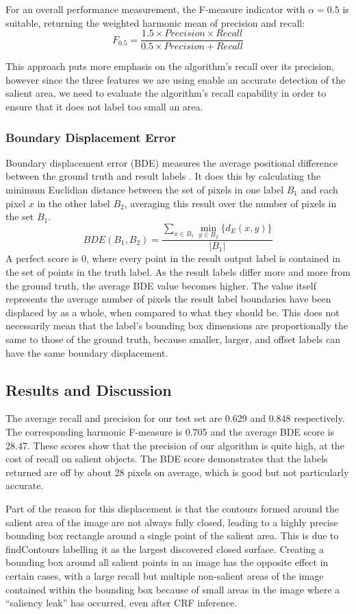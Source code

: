 \documentclass[10pt,twocolumn,letterpaper]{article}
\newcommand{\SUM}{\sum\limits}
\begin{document}
For an overall performance measurement, the F-measure indicator with $\alpha = 0.5$ is suitable, returning the weighted harmonic mean of precision and recall:$$F_{0.5} = \frac{1.5\times Precision \times Recall}{ 0.5 \times Precision + Recall}$$

This approach puts more emphasis on the algorithm's recall over its precision, however since the three features we are using enable an accurate detection of the salient area, we need to evaluate the algorithm's recall capability in order to ensure that it does not label too small an area.

\subsubsection{Boundary Displacement Error}
Boundary displacement error (BDE) measures the average positional difference between the ground truth and result labels \cite{bde}.  It does this by calculating the minimum Euclidian distance between the set of pixels in one label $B_1$ and each pixel $x$ in the other label $B_2$, averaging this result over the number of pixels in the set $B_1$. $$BDE(B_1,B_2)=\frac{\SUM_{x\in B_1}\min\limits_{y\in B_2}\{d_E(x,y)\}}{|B_1|}$$  A perfect score is 0, where every point in the result output label is contained in the set of points in the truth label.  As the result labels differ more and more from the ground truth, the average BDE value becomes higher.  The value itself represents the average number of pixels the result label boundaries have been displaced by as a whole, when compared to what they should be.  This does not necessarily mean that the label's bounding box dimensions are proportionally the same to those of the ground truth, because smaller, larger, and offset labels can have the same boundary displacement. 

\subsection{Results and Discussion}

The average recall and precision for our test set are 0.629 and 0.848 respectively.  The corresponding harmonic F-measure is 0.705 and the average BDE score is 28.47.  These scores show that the precision of our algorithm is quite high, at the cost of recall on salient objects.  The BDE score demonstrates that the labels returned are off by about 28 pixels on average, which is good but not particularly accurate.

Part of the reason for this displacement is that the contours formed around the salient area of the image are not always fully closed, leading to a highly precise bounding box rectangle around a single point of the salient area.  This is due to findContours labelling it as the largest discovered closed surface.  Creating a bounding box around all salient points in an image has the opposite effect in certain cases, with a large recall but multiple non-salient areas of the image contained within the bounding box because of small areas in the image where a ``saliency leak'' has occurred, even after CRF  inference.
\end{document}
